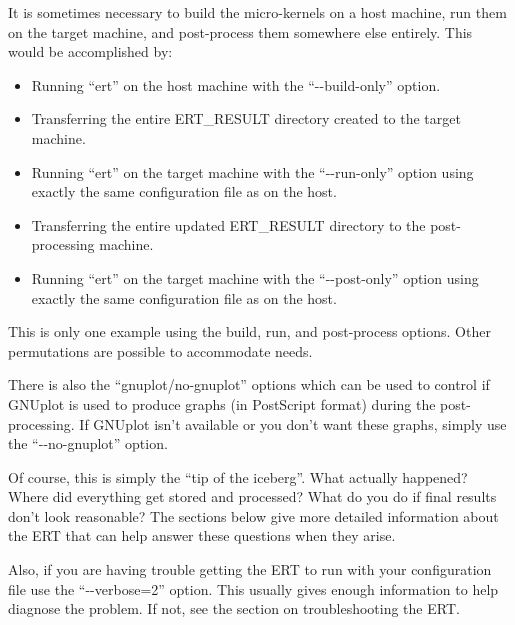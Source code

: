 It is sometimes necessary to build the micro-kernels on a host machine,
run them on the target machine, and post-process them somewhere else entirely.
This would be accomplished by:
\begin{itemize}

\vspace{-0.1in}
\item{Running ``ert'' on the host machine with the ``-{}-build-only'' option.}

\vspace{-0.1in}
\item{Transferring the entire ERT\_\+RESULT directory created to the target
      machine.}

\vspace{-0.1in}
\item{Running ``ert'' on the target machine with the ``-{}-run-only'' option
      using exactly the same configuration file as on the host.}

\vspace{-0.1in}
\item{Transferring the entire updated ERT\_\+RESULT directory to the
      post-processing machine.}

\vspace{-0.1in}
\item{Running ``ert'' on the target machine with the ``-{}-post-only'' option
      using exactly the same configuration file as on the host.}

\end{itemize}
This is only one example using the build, run, and post-process options.
Other permutations are possible to accommodate needs.

There is also the ``gnuplot/no-gnuplot'' options which can be used to control
if GNUplot is used to produce graphs (in PostScript format) during the
post-processing.  If GNUplot isn't available or you don't want these graphs,
simply use the ``-{}-no-gnuplot'' option.

Of course, this is simply the ``tip of the iceberg''.  What actually happened?
Where did everything get stored and processed?  What do you do if final
results don't look reasonable?  The sections below give more detailed
information about the ERT that can help answer these questions when they
arise.

Also, if you are having trouble getting the ERT to run with your configuration
file use the ``-{}-verbose=2'' option.  This usually gives enough information
to help diagnose the problem.  If not, see the section on troubleshooting the
ERT.

